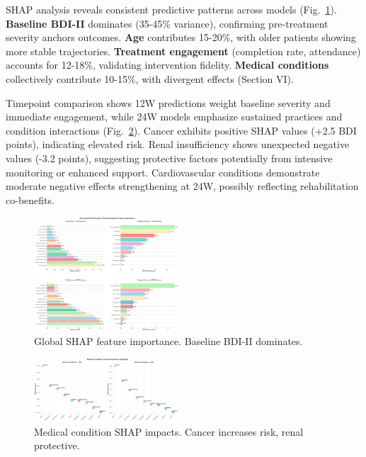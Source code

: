\documentclass[conference]{IEEEtran}
\begin{document}
SHAP analysis reveals consistent predictive patterns across models (Fig.~\ref{fig:shap_global}). \textbf{Baseline BDI-II} dominates (35-45\% variance), confirming pre-treatment severity anchors outcomes. \textbf{Age} contributes 15-20\%, with older patients showing more stable trajectories. \textbf{Treatment engagement} (completion rate, attendance) accounts for 12-18\%, validating intervention fidelity. \textbf{Medical conditions} collectively contribute 10-15\%, with divergent effects (Section VI).

Timepoint comparison shows 12W predictions weight baseline severity and immediate engagement, while 24W models emphasize sustained practices and condition interactions (Fig.~\ref{fig:shap_conditions}). Cancer exhibits positive SHAP values (+2.5 BDI points), indicating elevated risk. Renal insufficiency shows unexpected negative values (-3.2 points), suggesting protective factors potentially from intensive monitoring or enhanced support. Cardiovascular conditions demonstrate moderate negative effects strengthening at 24W, possibly reflecting rehabilitation co-benefits.

\begin{figure}[h]
\centering
\includegraphics[width=0.48\textwidth]{figures/shap_feature_importance_static.png}
\caption{Global SHAP feature importance. Baseline BDI-II dominates.}
\label{fig:shap_global}
\end{figure}

\begin{figure}[h]
\centering
\includegraphics[width=0.48\textwidth]{figures/medical_conditions_shap_spotlight.png}
\caption{Medical condition SHAP impacts. Cancer increases risk, renal protective.}
\label{fig:shap_conditions}
\end{figure}
\end{document}
